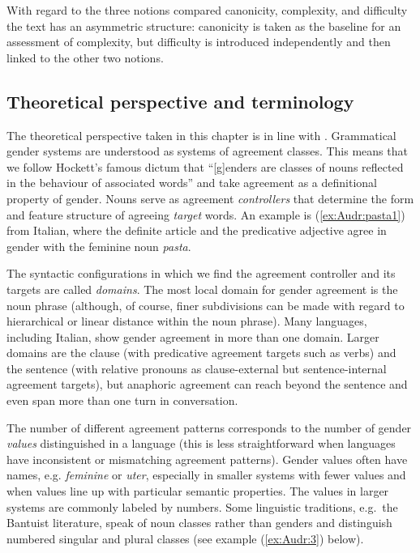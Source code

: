 \documentclass[output=collectionpaper]{langsci/langscibook}
\begin{document}
With regard to the three notions compared \textendash{} canonicity, com\-plex\-i\-ty, and dif\-fi\-cul\-ty \textendash{} the text has an asymmetric structure: canonicity is taken as the baseline for an assessment of complexity, but difficulty is introduced independently and then linked to the other two notions.

\subsection{Theoretical perspective and terminology}
\label{sec:Audr:1.2}
The theoretical perspective taken in this chapter is in line with \citet{Corbett1991,Corbett2013,Corbett2013a,Corbett2013b}. Grammatical gender systems are understood as systems of agreement classes. This means that we follow Hockett's famous dictum that ``[g]enders are classes of nouns reflected in the behaviour of associated words'' \citep[231]{Hockett1958} and take agreement as a definitional property of gender. Nouns serve as agreement \textit{controllers} that determine the form and feature structure of agreeing \textit{target} words. An example is (\ref{ex:Audr:pasta1}) from Italian, where the definite article and the predicative adjective agree in gender with the feminine noun \textit{pasta}.

%

The syntactic configurations in which we find the agreement controller and its targets are called \textit{domains}. The most local domain for gender agreement is the noun phrase (although, of course, finer subdivisions can be made with regard to hierarchical or linear distance within the noun phrase). Many languages, including Italian, show gender agreement in more than one domain. Larger domains are the clause (with predicative agreement targets such as verbs) and the sentence (with relative pronouns as clause-external but sentence-internal agreement targets), but anaphoric agreement can reach beyond the sentence and even span more than one turn in conversation.

The number of different agreement patterns corresponds to the number of gender \textit{values} distinguished in a language (this is less straightforward when languages have inconsistent or mismatching agreement patterns). Gender values often have names, e.g. \textit{feminine} or \textit{uter}, especially in smaller systems with fewer values and when values line up with particular semantic properties. The values in larger systems are commonly labeled by numbers. Some linguistic traditions, e.g.\ the Bantuist literature, speak of noun classes rather than genders and distinguish numbered singular and plural classes (see example (\ref{ex:Audr:3}) below).
\end{document}

